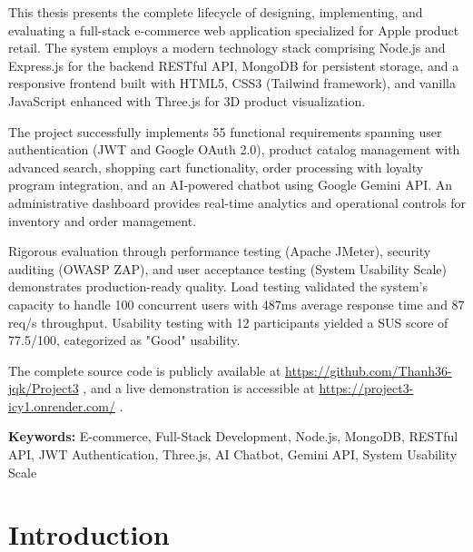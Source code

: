 \documentclass[12pt, a4paper]{report}
\begin{document}
This thesis presents the complete lifecycle of designing, implementing, and evaluating a full-stack e-commerce web application specialized for Apple product retail. The system employs a modern technology stack comprising Node.js and Express.js for the backend RESTful API, MongoDB for persistent storage, and a responsive frontend built with HTML5, CSS3 (Tailwind framework), and vanilla JavaScript enhanced with Three.js for 3D product visualization.

The project successfully implements 55 functional requirements spanning user authentication (JWT and Google OAuth 2.0), product catalog management with advanced search, shopping cart functionality, order processing with loyalty program integration, and an AI-powered chatbot using Google Gemini API. An administrative dashboard provides real-time analytics and operational controls for inventory and order management.

Rigorous evaluation through performance testing (Apache JMeter), security auditing (OWASP ZAP), and user acceptance testing (System Usability Scale) demonstrates production-ready quality. Load testing validated the system's capacity to handle 100 concurrent users with 487ms average response time and 87 req/s throughput. Usability testing with 12 participants yielded a SUS score of 77.5/100, categorized as "Good" usability.

The complete source code is publicly available at \url{https://github.com/Thanh36-jqk/Project3} \cite{projectgithub}, and a live demonstration is accessible at \url{https://project3-icy1.onrender.com/} \cite{projectdemo}.

\textbf{Keywords:} E-commerce, Full-Stack Development, Node.js, MongoDB, RESTful API, JWT Authentication, Three.js, AI Chatbot, Gemini API, System Usability Scale

\tableofcontents
\newpage

\listoffigures
\newpage

\listoftables
\newpage

\setcounter{page}{1}


\chapter{Introduction}
\end{document}
